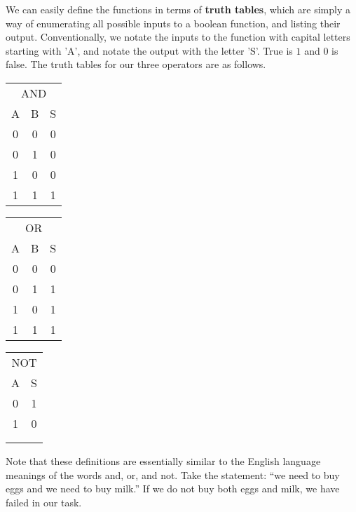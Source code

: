 We can easily define the functions in terms of \textbf{truth tables}, which are simply a way of enumerating all possible inputs to a boolean function, and listing their output. Conventionally, we notate the inputs to the function with capital letters starting with 'A', and notate the output with the letter 'S'. True is $1$ and $0$ is false. The truth tables for our three operators are as follows.

\begin{center}
\begin{tabular}{c c | c}
  \multicolumn{3}{c}{AND}\\
  A & B & S\\
  \hline
  \rowcolor{txtbkpaleblue}
  0 & 0 & 0\\
  0 & 1 & 0\\
  \rowcolor{txtbkpaleblue}
  1 & 0 & 0\\
  1 & 1 & 1\\
\end{tabular}
\hspace{1in}
\begin{tabular}{c c | c}
  \multicolumn{3}{c}{OR}\\
  A & B & S\\
  \hline
  \rowcolor{txtbkpaleblue}
  0 & 0 & 0\\
  0 & 1 & 1\\
  \rowcolor{txtbkpaleblue}
  1 & 0 & 1\\
  1 & 1 & 1\\
\end{tabular}
\hspace{1in}
\begin{tabular}{c | c}
  \multicolumn{2}{c}{NOT}\\
  A & S\\
  \hline
  \rowcolor{txtbkpaleblue}
  0 & 1\\
  1 & 0\\
  \multicolumn{2}{c}{}\\
  \multicolumn{2}{c}{}\\
\end{tabular}
\end{center}
Note that these definitions are essentially similar to the English language meanings of the words and, or, and not. Take the statement: ``we need to buy eggs and we need to buy milk.'' If we do not buy both eggs and milk, we have failed in our task.\\

